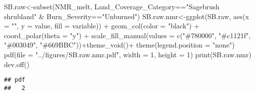 \documentclass[
]{article}
\newenvironment{Shaded}{\begin{snugshade}}{\end{snugshade}}
\newcommand{\AttributeTok}[1]{\textcolor[rgb]{0.77,0.63,0.00}{#1}}
\newcommand{\DecValTok}[1]{\textcolor[rgb]{0.00,0.00,0.81}{#1}}
\newcommand{\FunctionTok}[1]{\textcolor[rgb]{0.00,0.00,0.00}{#1}}
\newcommand{\NormalTok}[1]{#1}
\newcommand{\OtherTok}[1]{\textcolor[rgb]{0.56,0.35,0.01}{#1}}
\newcommand{\SpecialCharTok}[1]{\textcolor[rgb]{0.00,0.00,0.00}{#1}}
\newcommand{\StringTok}[1]{\textcolor[rgb]{0.31,0.60,0.02}{#1}}
\begin{document}
\begin{Shaded}
\begin{Highlighting}[]
\NormalTok{SB.raw}\OtherTok{\textless{}{-}}\FunctionTok{subset}\NormalTok{(NMR\_melt, Land\_Coverage\_Category}\SpecialCharTok{==}\StringTok{"Sagebrush shrubland"} \SpecialCharTok{\&}\NormalTok{ Burn\_Severity}\SpecialCharTok{==}\StringTok{"Unburned"}\NormalTok{)}
\NormalTok{SB.raw.nmr}\OtherTok{\textless{}{-}}\FunctionTok{ggplot}\NormalTok{(SB.raw, }\FunctionTok{aes}\NormalTok{(}\AttributeTok{x =} \StringTok{""}\NormalTok{, }\AttributeTok{y =}\NormalTok{ value, }\AttributeTok{fill =}\NormalTok{ variable)) }\SpecialCharTok{+}
    \FunctionTok{geom\_col}\NormalTok{(}\AttributeTok{color =} \StringTok{"black"}\NormalTok{) }\SpecialCharTok{+}
    \FunctionTok{coord\_polar}\NormalTok{(}\AttributeTok{theta =} \StringTok{"y"}\NormalTok{) }\SpecialCharTok{+} \FunctionTok{scale\_fill\_manual}\NormalTok{(}\AttributeTok{values =} \FunctionTok{c}\NormalTok{(}\StringTok{"\#780000"}\NormalTok{, }\StringTok{"\#c1121f"}\NormalTok{, }\StringTok{"\#003049"}\NormalTok{, }\StringTok{"\#669BBC"}\NormalTok{))}\SpecialCharTok{+}\FunctionTok{theme\_void}\NormalTok{()}\SpecialCharTok{+}
    \FunctionTok{theme}\NormalTok{(}\AttributeTok{legend.position =} \StringTok{"none"}\NormalTok{)}
\FunctionTok{pdf}\NormalTok{(}\AttributeTok{file =} \StringTok{"../figures/SB.raw.nmr.pdf"}\NormalTok{, }\AttributeTok{width =} \DecValTok{1}\NormalTok{, }\AttributeTok{height =} \DecValTok{1}\NormalTok{) }
\FunctionTok{print}\NormalTok{(SB.raw.nmr)}
\FunctionTok{dev.off}\NormalTok{()}
\end{Highlighting}
\end{Shaded}

\begin{verbatim}
## pdf 
##   2
\end{verbatim}
\end{document}
